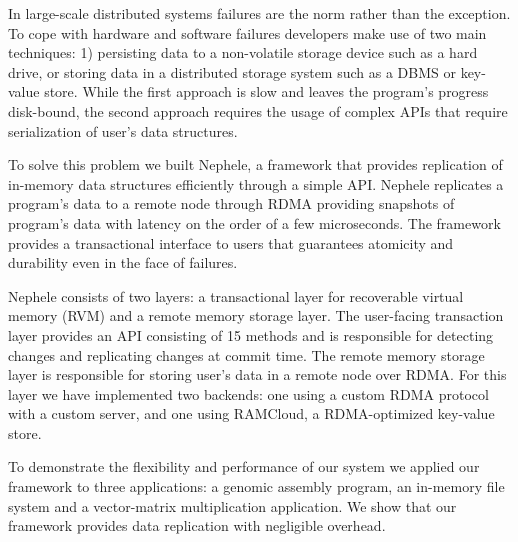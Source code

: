 In large-scale distributed systems failures are the norm rather than the exception. 
To cope with hardware and software failures developers make use of two main techniques: 1) persisting data to a non-volatile storage device such as a hard drive, or storing data in a distributed storage system such as a DBMS or key-value store. 
While the first approach is slow and leaves the program's progress disk-bound, the second approach requires the usage of complex APIs that require serialization of user's data structures.

To solve this problem we built Nephele, a framework that provides replication of in-memory data structures efficiently through a simple API. 
Nephele replicates a program's data to a remote node through RDMA providing snapshots of program's data with latency on the order of a few microseconds.
The framework provides a transactional interface to users that guarantees atomicity and durability even in the face of failures.

Nephele consists of two layers: a transactional layer for recoverable virtual memory (RVM) and a remote memory storage layer. The user-facing transaction layer provides an API consisting of 15 methods and is responsible for detecting changes and replicating changes at commit time. The remote memory storage layer is responsible for storing user's data in a remote node over RDMA. For this layer we have implemented two backends: one using a custom RDMA protocol with a custom server, and one using RAMCloud, a RDMA-optimized key-value store.

To demonstrate the flexibility and performance of our system we applied our framework to three applications: a genomic assembly program, an in-memory file system and a vector-matrix multiplication application.
We show that our framework provides data replication with negligible overhead.

